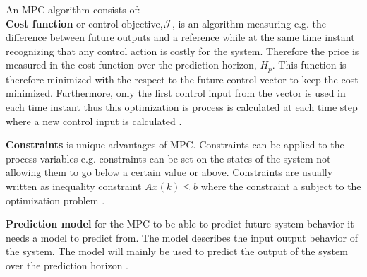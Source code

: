 An MPC algorithm consists of:
\\ 
\textbf{Cost function} or control objective,$\CMcal{J}$, is an algorithm measuring e.g. the difference between future outputs and a reference while at the same time instant recognizing that any control action is costly for the system. Therefore the price is measured in the cost function over the prediction horizon, $H_p$. This function is therefore minimized with the respect to the future control vector to keep the cost minimized. Furthermore, only the first control input from the vector is used in each time instant thus this optimization is process is calculated at each time step where a new control input is calculated \cite{mpc_control_lecture_notes}.

\textbf{Constraints} is unique advantages of MPC. Constraints can be applied to the process variables e.g. constraints can be set on the states of the system not allowing them to go below a certain value or above. Constraints are usually written as inequality constraint $Ax(k)\leq b$ where the constraint a subject to the optimization problem \cite{mpc_control_lecture_notes}.   

\textbf{Prediction model} for the MPC to be able to predict future system behavior it needs a model to predict from. The model describes the input output behavior of the system. The model will mainly be used to predict the output of the system over the prediction horizon \cite{mpc_control_lecture_notes}.  



